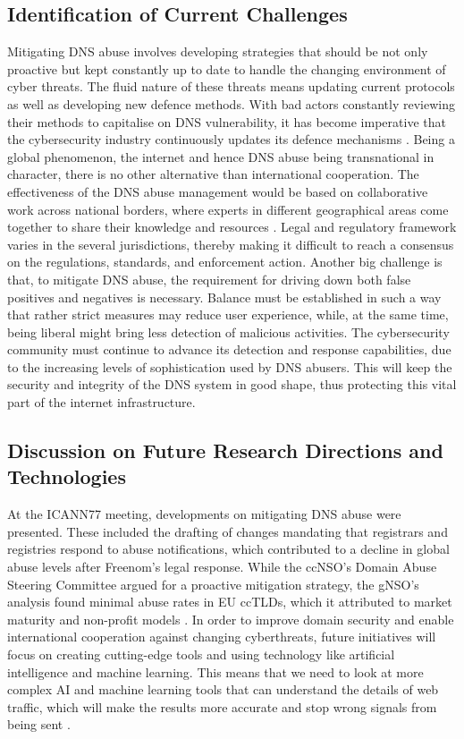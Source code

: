 \subsection{Identification of Current Challenges}

Mitigating DNS abuse involves developing strategies that should be not only proactive but kept constantly up to date to handle the changing environment of cyber threats. The fluid nature of these threats means updating current protocols as well as developing new defence methods. With bad actors constantly reviewing their methods to capitalise on DNS vulnerability, it has become imperative that the cybersecurity industry continuously updates its defence mechanisms \cite{bhattacharya2023dns}. Being a global phenomenon, the internet and hence DNS abuse being transnational in character, there is no other alternative than international cooperation. The effectiveness of the DNS abuse management would be based on collaborative work across national borders, where experts in different geographical areas come together to share their knowledge and resources \cite{altulaihan2022cybersecurity}. Legal and regulatory framework varies in the several jurisdictions, thereby making it difficult to reach a consensus on the regulations, standards, and enforcement action. Another big challenge is that, to mitigate DNS abuse, the requirement for driving down both false positives and negatives is necessary. Balance must be established in such a way that rather strict measures may reduce user experience, while, at the same time, being liberal might bring less detection of malicious activities. The cybersecurity community must continue to advance its detection and response capabilities, due to the increasing levels of sophistication used by DNS abusers. This will keep the security and integrity of the DNS system in good shape, thus protecting this vital part of the internet infrastructure.

\subsection{Discussion on Future Research Directions and Technologies}

At the ICANN77 meeting, developments on mitigating DNS abuse were presented. These included the drafting of changes mandating that registrars and registries respond to abuse notifications, which contributed to a decline in global abuse levels after Freenom's legal response. While the ccNSO's Domain Abuse Steering Committee argued for a proactive mitigation strategy, the gNSO's analysis found minimal abuse rates in EU ccTLDs, which it attributed to market maturity and non-profit models \cite{VanRoste2023}. In order to improve domain security and enable international cooperation against changing cyberthreats, future initiatives will focus on creating cutting-edge tools and using technology like artificial intelligence and machine learning. This means that we need to look at more complex AI and machine learning tools that can understand the details of web traffic, which will make the results more accurate and stop wrong signals from being sent \cite{ISG2023}.

